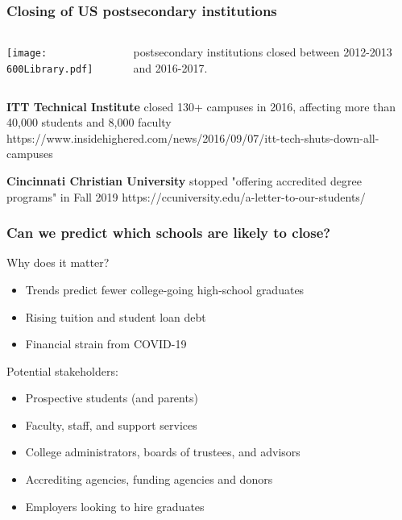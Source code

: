 \documentclass{beamer}
\begin{document}
\begin{frame}
\frametitle{Closing of US postsecondary institutions}

\begin{minipage}[0.5\textheight]{\textwidth}
\begin{columns}[T]
\begin{column}{0.65\textwidth}
\texttt{[image: 600Library.pdf]}
\end{column}
\begin{column}{0.35\textwidth}
\vspace{.7in}
postsecondary institutions closed between 2012-2013 and 2016-2017.
\end{column}
\end{columns}
\end{minipage}

\vspace{1.5em}

\textbf{ITT Technical Institute} closed 130+ campuses in 2016, affecting more than 40,000 students and 8,000 faculty \newline \tiny{https://www.insidehighered.com/news/2016/09/07/itt-tech-shuts-down-all-campuses}
\vspace{1.5em}

\normalsize \textbf{Cincinnati Christian University} stopped "offering accredited degree programs" in Fall 2019  \tiny{https://ccuniversity.edu/a-letter-to-our-students/}

\end{frame}

\begin{frame}
\frametitle{Can we predict which schools are likely to close?}

Why does it matter?
\begin{itemize}
\item Trends predict fewer college-going high-school graduates
\item Rising tuition and student loan debt
\item Financial strain from COVID-19
\end{itemize}

\vspace{1em}

Potential stakeholders:
\begin{itemize}
\item Prospective students (and parents)
\item Faculty, staff, and support services
\item College administrators, boards of trustees, and advisors
\item Accrediting agencies, funding agencies and donors
\item Employers looking to hire graduates
\end{itemize}
\end{frame}
\end{document}
